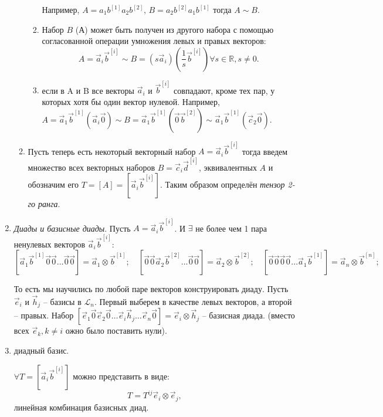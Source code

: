 \begin{definition}
\begin{enumerate}
\begin{enumerate}
\begin{enumerate}
              Например,
                $A = a_1 b^{[1]} a_2 b^{[2]}, \, B = a_2 b^{[2]} a_1 b^{[1]}$ тогда $A \sim B$.

            \item Набор $B$ (А) может быть получен из другого набора с помощью согласованной операции
              умножения левых и правых векторов:
              \[
                A = \vec{a}_i \vec{b}^{[i]} \sim B = (s \vec{a}_i) (\dfrac{1}{s} \vec{b}^{[i]})
                \forall s \in \mathbb{R}, s \neq 0.
              \]

            \item если в A и B все векторы $\vec{a}_i$ и $\vec{b}^{[i]}$ совпадают, кроме тех пар,
              у которых хотя бы один вектор нулевой.
              Например,
              $A=\vec{a}_1 \vec{b}^{[1]} (\vec{a}_i \vec{0}) \sim B = \vec{a}_1 \vec{b}^{[1]} (\vec{0} \vec{b}^{[2]}) \sim \vec{a}_1 \vec{b}^{[1]} (\vec{c}_{2} \vec{0})$.
          \end{enumerate}

        \item Пусть теперь есть некоторый векторный набор $A = \vec{a}_i \vec{b}^{[i]}$ тогда введем 
          множество всех векторных наборов $B = \vec{c}_i \vec{d}^{[i]}$, эквивалентных $A$ и
          обозначим его $T = [A] = [\vec{a}_i \vec{b}^{[i]}]$. Таким образом определён
          \emph{тензор 2-го ранга}.
    \end{enumerate}

  \item \emph{Диады и базисные диады}. Пусть $A = \vec{a}_i \vec{b}^{[i]}$. И 
    $\exists$ не более чем 1 пара ненулевых векторов $\vec{a}_i \vec{b}^{[i]}$:
    \[
      [\vec{a}_1 \vec{b}^{[1]} \vec{0} \vec{0} \dots \vec{0} \vec{0}] = \vec{a}_1 \otimes \vec{b}^{[1]}; \quad
      [\vec{0} \vec{0} \vec{a}_2 \vec{b}^{[2]} \dots \vec{0} \vec{0}] = \vec{a}_2 \otimes \vec{b}^{[2]}; \quad
      [\vec{0} \vec{0} \vec{0} \vec{0} \dots \vec{a}_1 \vec{b}^{[1]}] = \vec{a}_n \otimes \vec{b}^{[n]};
    \]

    То есть мы научились по любой паре векторов конструировать диаду. Пусть $\vec{e}_i$ и
    $\vec{h}_j$ -- базисы в $\mathcal{L}_n$. Первый выберем в качестве левых векторов, а
    второй -- правых. Набор $[\vec{e}_1 \vec{0} \vec{e}_2 \vec{0} \dots \vec{e}_i \vec{h}_j \dots \vec{e}_n \vec{0}] = \vec{e}_i \otimes \vec{h}_j$ -- базисная диада. (вместо всех $\vec{e}_k, k\neq i$ ожно было поставить нули). 

  \item диадный базис. %
    \begin{theorem}
      $\forall T = [\vec{a}_i \vec{b}^{[i]}]$ можно представить в виде: 
      \begin{equation}\label{lec_2:eq:tensor_basis}
        T = T^{ij} \vec{e}_i \otimes \vec{e}_j,
      \end{equation}
      линейная комбинация базисных диад.


\end{theorem}
\end{enumerate}
\end{definition}
